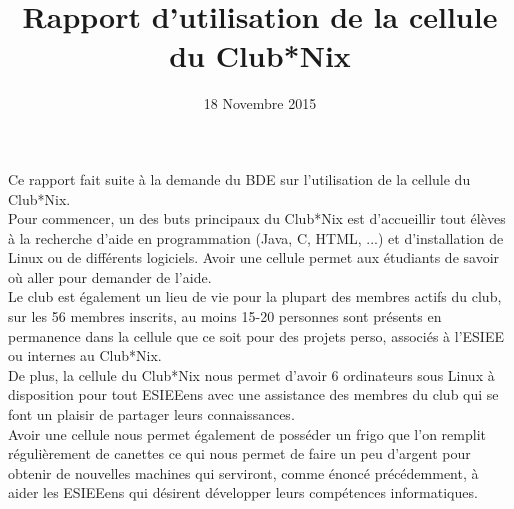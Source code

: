 \documentclass[11pt]{article}
\title{Rapport d'utilisation de la cellule du Club*Nix}
\date{18 Novembre 2015}
\begin{document}
\maketitle
\paragraph{}Ce rapport fait suite à la demande du BDE sur l'utilisation de la cellule du Club*Nix. \\
Pour commencer, un des buts principaux du Club*Nix est d'accueillir tout élèves à la recherche d'aide en programmation (Java, C, HTML, ...) et d'installation de Linux ou de différents logiciels. Avoir une cellule permet aux étudiants de savoir où aller pour demander de l'aide. \\
Le club est également un lieu de vie pour la plupart des membres actifs du club, sur les 56 membres inscrits, au moins 15-20 personnes sont présents en permanence dans la cellule que ce soit pour des projets perso, associés à l'ESIEE ou internes au Club*Nix. \\
De plus, la cellule du Club*Nix nous permet d'avoir 6 ordinateurs sous Linux à disposition pour tout ESIEEens avec une assistance des membres du club qui se font un plaisir de partager leurs connaissances. \\
Avoir une cellule nous permet également de posséder un frigo que l'on remplit régulièrement de canettes ce qui nous permet de faire un peu d'argent pour obtenir de nouvelles machines qui serviront, comme énoncé précédemment, à aider les ESIEEens qui désirent développer leurs compétences informatiques.
\end{document}
